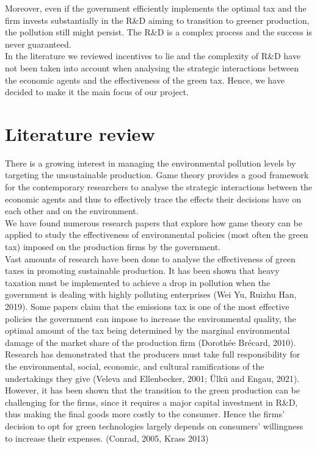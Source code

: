 \documentclass{article}
\begin{document}
Moreover, even if the government efficiently implements the optimal tax and the firm invests substantially in the R\&D aiming to transition to greener production, the pollution still might persist. The R\&D is a complex process and the success is never guaranteed. \\

In the literature we reviewed incentives to lie and the complexity of R\&D have not been taken into account when analysing the strategic interactions between the economic agents and the effectiveness of the green tax. Hence, we have decided to make it the main focus of our project.  \\


\section{Literature review}

There is a growing interest in managing the environmental pollution levels by targeting the unsustainable production. Game theory provides a good framework for the contemporary researchers to analyse the strategic interactions between the economic agents and thus to effectively trace the effects their decisions have on each other and on the environment. \\

We have found numerous research papers that explore how game theory can be applied to study the effectiveness of environmental policies (most often the green tax) imposed on the production firms by the government. \\

Vast amounts of research have been done to analyse the effectiveness of green taxes in promoting sustainable production. It has been shown that heavy taxation must be implemented to achieve a drop in pollution when the government is dealing with highly polluting enterprises (Wei Yu, Ruizhu Han, 2019). Some papers claim that the emissions tax is one of the most effective policies the government can impose to increase the environmental quality, the optimal amount of the tax being determined by the marginal environmental damage of the market share of the production firm (Dorothée Brécard, 2010). \\

Research has demonstrated that the producers must take full responsibility for the environmental, social, economic, and cultural ramifications of the undertakings they give (Veleva and Ellenbecker, 2001; Ülkü and Engau, 2021). However, it has been shown that the transition to the green production can be challenging for the firms, since it requires a major capital investment in R\&D, thus making the final goods more costly to the consumer. Hence the firms’ decision to opt for green technologies largely depends on consumers’ willingness to increase their expenses. (Conrad, 2005, Krass 2013) \\ 
\end{document}
